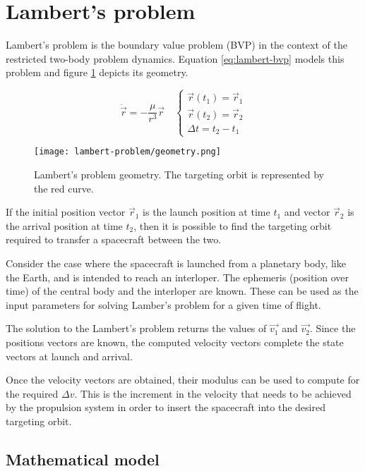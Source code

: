 \section{Lambert's problem}

Lambert's problem is the boundary value problem (BVP) in the context of the
restricted two-body problem dynamics. Equation \ref{eq:lambert-bvp} models this
problem and figure \ref{fig:lambert-geometry} depicts its geometry.

\begin{equation}
    \ddot{\vec{r}} = -\frac{\mu}{r^3}\vec{r} \quad \begin{cases}
        \vec{r}(t_1) = \vec{r}_1 \\ 
        \vec{r}(t_2) = \vec{r}_2 \\ 
        \Delta t = t_2 - t_1
    \end{cases}
    \label{eq:lambert-bvp}
\end{equation}

\begin{figure}[H]
    \centering
    \texttt{[image: lambert-problem/geometry.png]}
    \caption{Lambert's problem geometry. The targeting orbit is represented by the red curve.}
    \label{fig:lambert-geometry}
\end{figure}

If the initial position vector $\vec{r}_1$ is the launch position at time
$t_1$ and vector $\vec{r}_2$ is the arrival position at time $t_2$,
then it is possible to find the targeting orbit required to transfer a
spacecraft between the two.

Consider the case where the spacecraft is launched from a planetary body, like
the Earth, and is intended to reach an interloper. The ephemeris (position over
time) of the central body and the interloper are known. These can be used as the
input parameters for solving Lamber's problem for a given time of flight.

The solution to the Lambert's problem returns the values of $\vec{v_1}$ and
$\vec{v_2}$. Since the positions vectors are known, the computed velocity
vectors complete the state vectors at launch and arrival.

Once the velocity vectors are obtained, their modulus can be used to compute for
the required $\Delta v$. This is the increment in the velocity that needs to be
achieved by the propulsion system in order to insert the spacecraft into the
desired targeting orbit.

\subsection{Mathematical model}

